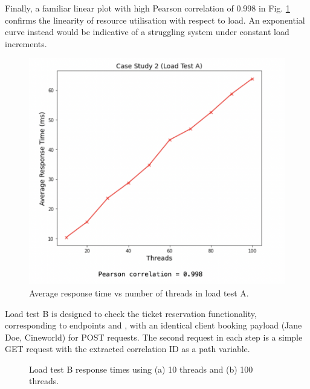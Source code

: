 Finally, a familiar linear plot with high Pearson correlation of 0.998 in Fig. \ref{fig:cs02-lta-4} confirms the linearity of resource utilisation with respect to load. An exponential curve instead would be indicative of a struggling system under constant load increments.

\begin{figure}[H]
  \centering
  \includegraphics[width=0.55\linewidth]{./assets/images/case-studies/cs02-lta-4.png}
  \caption{Average response time vs number of threads in load test A.}
  \label{fig:cs02-lta-4}
\end{figure}

Load test B is designed to check the ticket reservation functionality, corresponding to endpoints  and , with an identical client booking payload (Jane Doe, Cineworld) for POST requests. The second request in each step is a simple GET request with the extracted correlation ID as a path variable.

\begin{figure}[H]
  \centering
  \caption{Load test B response times using (a) 10 threads and (b) 100 threads.}
  \label{fig:cs02-ltb-12}
\end{figure}

